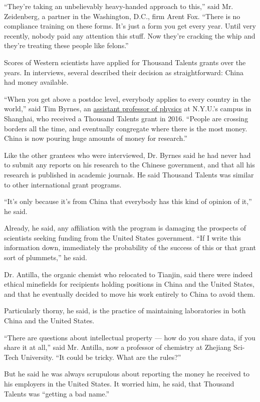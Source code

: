 ``They're taking an unbelievably heavy-handed approach to this,'' said
Mr. Zeidenberg, a partner in the Washington, D.C., firm Arent Fox.
``There is no compliance training on these forms. It's just a form you
get every year. Until very recently, nobody paid any attention this
stuff. Now they're cracking the whip and they're treating these people
like felons.''

Scores of Western scientists have applied for Thousand Talents grants
over the years. In interviews, several described their decision as
straightforward: China had money available.

``When you get above a postdoc level, everybody applies to every country
in the world,'' said Tim Byrnes, an
\href{https://shanghai.nyu.edu/academics/faculty/directory/tim-byrnes}{assistant
professor of physics} at N.Y.U.'s campus in Shanghai, who received a
Thousand Talents grant in 2016. ``People are crossing borders all the
time, and eventually congregate where there is the most money. China is
now pouring huge amounts of money for research.''

Like the other grantees who were interviewed, Dr. Byrnes said he had
never had to submit any reports on his research to the Chinese
government, and that all his research is published in academic journals.
He said Thousand Talents was similar to other international grant
programs.

``It's only because it's from China that everybody has this kind of
opinion of it,'' he said.

Already, he said, any affiliation with the program is damaging the
prospects of scientists seeking funding from the United States
government. ``If I write this information down, immediately the
probability of the success of this or that grant sort of plummets,'' he
said.

Dr. Antilla, the organic chemist who relocated to Tianjin, said there
were indeed ethical minefields for recipients holding positions in China
and the United States, and that he eventually decided to move his work
entirely to China to avoid them.

Particularly thorny, he said, is the practice of maintaining
laboratories in both China and the United States.

``There are questions about intellectual property --- how do you share
data, if you share it at all,'' said Mr. Antilla, now a professor of
chemistry at Zhejiang Sci-Tech University. ``It could be tricky. What
are the rules?''

But he said he was always scrupulous about reporting the money he
received to his employers in the United States. It worried him, he said,
that Thousand Talents was ``getting a bad name.''

